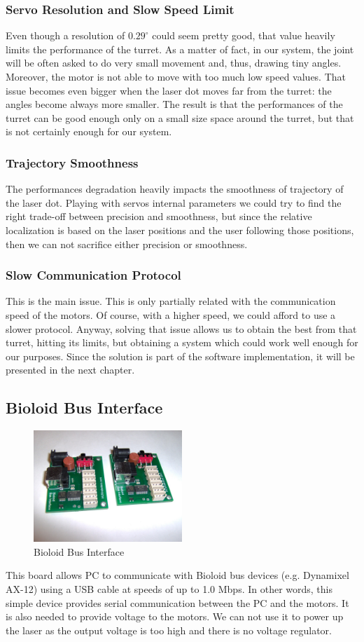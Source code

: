 \subsubsection{Servo Resolution and Slow Speed Limit}
Even though a resolution of $0.29^{\circ}$ could seem pretty good, that value heavily limits the performance of the turret. As a matter of fact, in our system, the joint will be often asked to do very small movement and, thus, drawing tiny angles. Moreover, the motor is not able to move with too much low speed values. That issue becomes even bigger when the laser dot moves far from the turret: the angles become always more smaller. The result is that the performances of the turret can be good enough only on a small size space around the turret, but that is not certainly enough for our system.
\subsubsection{Trajectory Smoothness}
The performances degradation heavily impacts the smoothness of trajectory of the laser dot. Playing with servos internal parameters we could try to find the right trade-off between precision and smoothness, but since the relative localization is based on the laser positions and the user following those positions, then we can not sacrifice either precision or smoothness.
\subsubsection{Slow Communication Protocol}
This is the main issue. This is only partially related with the communication speed of the motors. Of course, with a higher speed, we could afford to use a slower protocol. Anyway, solving that issue allows us to obtain the best from that turret, hitting its limits, but obtaining a system which could work well enough for our purposes. Since the solution is part of the software implementation, it will be presented in the next chapter.

\subsection{Bioloid Bus Interface}
\begin{figure}
	\centering
	\includegraphics[width=0.5\textwidth]{img/busInterface.jpg}%
	\caption{Bioloid Bus Interface}
	\label{fig:busInterface}
\end{figure}
This board allows PC to communicate with Bioloid bus devices (e.g. Dynamixel AX-12) using a USB cable at speeds of up to 1.0 Mbps. In other words,
this simple device provides serial communication between the PC and the motors. It is also needed to provide voltage to the motors. We can not use it to power up the laser as the output voltage is too high and there is no voltage regulator.
